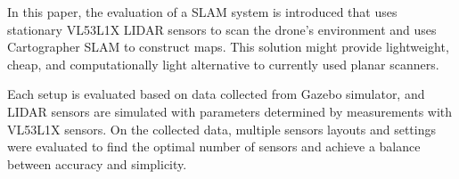 \documentclass[conference]{IEEEtran}
\begin{document}
In this paper, the evaluation of a SLAM system is introduced that uses stationary VL53L1X LIDAR sensors to scan
the drone's environment and uses Cartographer SLAM to construct maps. This solution might provide lightweight,
cheap, and computationally light alternative to currently used planar scanners. 

Each setup is evaluated based on data collected from Gazebo simulator, and LIDAR sensors are simulated with 
parameters determined by measurements with VL53L1X sensors. On the collected data, multiple sensors layouts and 
settings were evaluated to find the optimal number of sensors and achieve a balance between accuracy and simplicity.


%
%



%
%
\end{document}

